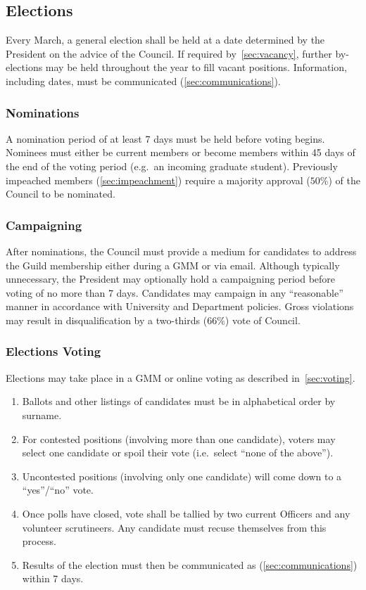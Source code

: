 \subsection{Elections}\label{sec:elections}
Every March, a general election shall be held at a date determined by the
President on the advice of the Council. If required by~\ref{sec:vacancy},
further by-elections may be held throughout the year to fill vacant positions.
Information, including dates, must be communicated (\ref{sec:communications}).

\subsubsection{Nominations}
A nomination period of at least 7 days must be held before voting begins.
Nominees must either be current members or become members within 45 days of the
end of the voting period (e.g.\ an incoming graduate student). Previously
impeached members (\ref{sec:impeachment}) require a majority approval ($50\%$)
of the Council to be nominated.

\subsubsection{Campaigning}
After nominations, the Council must provide a medium for candidates to address
the Guild membership either during a GMM or via email. Although typically
unnecessary, the President may optionally hold a campaigning period before
voting of no more than 7 days. Candidates may campaign in any ``reasonable''
manner in accordance with University and Department policies. Gross violations
may result in disqualification by a two-thirds ($66\%$) vote of Council.

\subsubsection{Elections Voting}
Elections may take place in a GMM or online voting as described
in~\ref{sec:voting}.

\begin{enumerate}
      \item Ballots and other listings of candidates must be in alphabetical order by
            surname.
      \item For contested positions (involving more than one candidate), voters may select
            one candidate or spoil their vote (i.e.\ select ``none of the above'').
      \item Uncontested positions (involving only one candidate) will come down to a
            ``yes''/``no'' vote.
      \item Once polls have closed, vote shall be tallied by two current Officers and any
            volunteer scrutineers. Any candidate must recuse themselves from this process.
      \item Results of the election must then be communicated as (\ref{sec:communications})
            within 7 days.
\end{enumerate}


